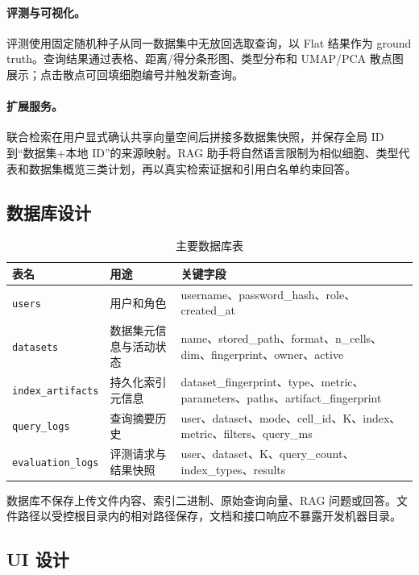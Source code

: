 \documentclass[11pt,a4paper]{article}
\newcommand{\code}[1]{\texttt{#1}}
\begin{document}
\paragraph{评测与可视化。}评测使用固定随机种子从同一数据集中无放回选取查询，以 Flat 结果作为 ground truth。查询结果通过表格、距离/得分条形图、类型分布和 UMAP/PCA 散点图展示；点击散点可回填细胞编号并触发新查询。

\paragraph{扩展服务。}联合检索在用户显式确认共享向量空间后拼接多数据集快照，并保存全局 ID 到“数据集+本地 ID”的来源映射。RAG 助手将自然语言限制为相似细胞、类型代表和数据集概览三类计划，再以真实检索证据和引用白名单约束回答。

\subsection{数据库设计}

\begin{table}[htbp]
  \centering
  \caption{主要数据库表}
  \label{tab:database}
  \begin{tabularx}{\textwidth}{p{}p{}Y}
    \toprule
    表名 & 用途 & 关键字段 \\
    \midrule
    \code{users} & 用户和角色 & username、password\_hash、role、created\_at \\
    \code{datasets} & 数据集元信息与活动状态 & name、stored\_path、format、n\_cells、dim、fingerprint、owner、active \\
    \code{index\_artifacts} & 持久化索引元信息 & dataset\_fingerprint、type、metric、parameters、paths、artifact\_fingerprint \\
    \code{query\_logs} & 查询摘要历史 & user、dataset、mode、cell\_id、K、index、metric、filters、query\_ms \\
    \code{evaluation\_logs} & 评测请求与结果快照 & user、dataset、K、query\_count、index\_types、results \\
    \bottomrule
  \end{tabularx}
\end{table}

数据库不保存上传文件内容、索引二进制、原始查询向量、RAG 问题或回答。文件路径以受控根目录内的相对路径保存，文档和接口响应不暴露开发机器目录。

\subsection{UI 设计}
\end{document}
